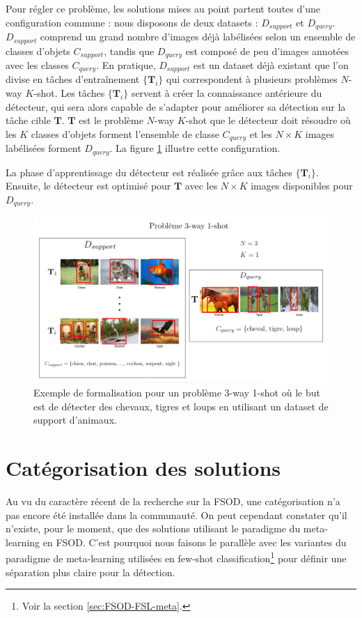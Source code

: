 Pour régler ce problème, les solutions mises au point partent toutes d'une configuration commune : nous disposons de deux datasets : $D_{support}$ et $D_{query}$. $D_{support}$ comprend un grand nombre d'images déjà labélisées selon un ensemble de classes d'objets $C_{support}$, tandis que $D_{query}$ est composé de peu d'images annotées avec les classes $C_{query}$. En pratique, $D_{support}$ est un dataset déjà existant que l'on divise en tâches d'entraînement $\{\textbf{T}_i\}$ qui correspondent à plusieurs problèmes $N$-way $K$-shot. Les tâches $\{\textbf{T}_i\}$ servent à créer la connaissance antérieure du détecteur, qui sera alors capable de s'adapter pour améliorer sa détection sur la tâche cible $\textbf{T}$. $\textbf{T}$ est le problème $N$-way $K$-shot que le détecteur doit résoudre où les $K$ classes d'objets forment l'ensemble de classe $C_{query}$ et les $N \times K$ images labélisées forment $D_{query}$. La figure \ref{fig:Formalisation-FSOD} illustre cette configuration.

La phase d'apprentissage du détecteur est réalisée grâce aux tâches $\{\textbf{T}_i\}$. Ensuite, le détecteur est optimisé pour $\textbf{T}$ avec les $N \times K$ images disponibles pour $D_{query}$.
\begin{figure}[!h]
\centering
\includegraphics[scale=0.5]{img/Formalisation-FSOD.PNG}
\caption{Exemple de formalisation pour un problème 3-way 1-shot où le but est de détecter des chevaux, tigres et loups en utilisant un dataset de support d'animaux.}
\label{fig:Formalisation-FSOD}
\end{figure}

\section{Catégorisation des solutions}
\label{sec:FSOD-categorisation}
Au vu du caractère récent de la recherche sur la FSOD, une catégorisation n'a pas encore été installée dans la communauté. On peut cependant constater qu'il n'existe, pour le moment, que des solutions utilisant le paradigme du meta-learning en FSOD. C'est pourquoi nous faisons le parallèle avec les variantes du paradigme de meta-learning utilisées en few-shot classification\footnote{Voir la section \ref{sec:FSOD-FSL-meta}.} pour définir une séparation plus claire pour la détection.


